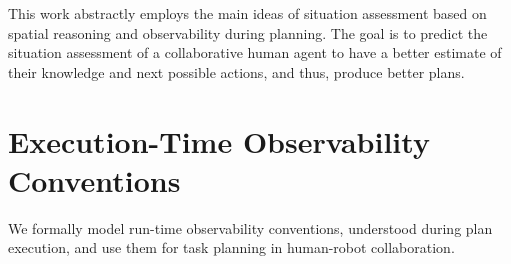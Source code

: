 \documentclass[letterpaper]{article} %
\begin{document}


This work abstractly employs the main ideas of situation assessment based on spatial reasoning and observability during planning. The goal is to predict the situation assessment of a collaborative human agent to have a better estimate of their knowledge and next possible actions, and thus, produce better plans.













\section{Execution-Time Observability Conventions}
We formally model run-time observability conventions, understood during plan execution, and use them for task planning in human-robot collaboration. 
\end{document}
